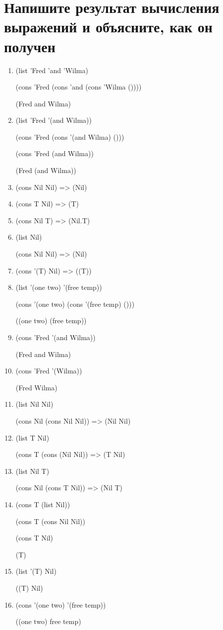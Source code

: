 \section{Напишите результат вычисления выражений и объясните, как он получен}
\begin{enumerate}
	\item (list 'Fred 'and 'Wilma)
	
	(cons 'Fred (cons 'and (cons 'Wilma ())))
	
	(Fred and Wilma)
	
	\item (list 'Fred '(and Wilma))
	
	(cons 'Fred (cons '(and Wilma) ()))
	
	(cons 'Fred (and Wilma))
	
	(Fred (and Wilma))
	
	\item (cons Nil Nil) => (Nil)
	
	\item (cons T Nil) => (T)
	\item (cons Nil T) => (Nil.T)
	\item (list Nil)
	
	(cons Nil Nil) => (Nil)
		
	\item (cons '(T) Nil) => ((T))
	
	\item (list '(one two) '(free temp))
	
	(cons '(one two) (cons '(free temp) ()))
	
	((one two) (free temp))
	
	\item (cons 'Fred '(and Wilma))
	
	(Fred and Wilma)
	
	\item (cons 'Fred '(Wilma))
	
	(Fred Wilma)
	
	\item (list Nil Nil)
	
	(cons Nil (cons Nil Nil)) => (Nil Nil)
	
	\item (list T Nil)
	
	(cons T (cons (Nil Nil)) => (T Nil)
	
	\item (list Nil T)
	
	(cons Nil (cons T Nil)) => (Nil T)
	
	\item (cons T (list Nil))
	
	(cons T (cons Nil Nil))
	
	(cons T Nil) 
	
	(T)
	
	\item (list '(T) Nil)
	
	((T) Nil)
	
	\item (cons '(one two) '(free temp))
	
	((one two) free temp)	
\end{enumerate}

